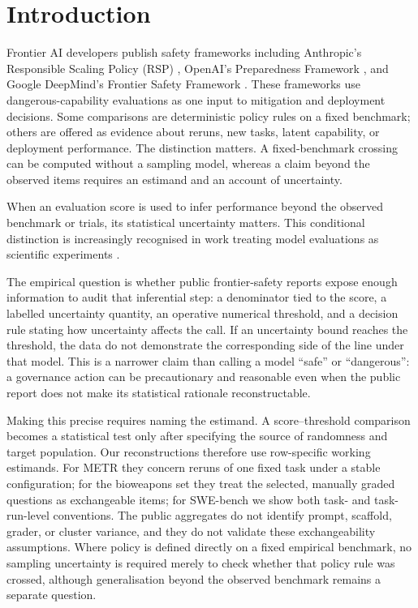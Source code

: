 \documentclass{article}
\begin{document}
\section{Introduction}

Frontier AI developers publish safety frameworks including Anthropic's Responsible Scaling
Policy (RSP) \citep{anthropic2026rsp}, OpenAI's Preparedness Framework
\citep{openai2025preparedness}, and Google DeepMind's Frontier Safety Framework
\citep{deepmind2025fsf}. These frameworks use dangerous-capability evaluations as one input
to mitigation and deployment decisions. Some comparisons are deterministic policy rules on
a fixed benchmark; others are offered as evidence about reruns, new tasks, latent
capability, or deployment performance. The distinction matters. A fixed-benchmark crossing
can be computed without a sampling model, whereas a claim beyond the observed items requires
an estimand and an account of uncertainty.

When an evaluation score is used to infer performance beyond the observed benchmark or
trials, its statistical uncertainty matters. This conditional distinction is increasingly
recognised in work treating model evaluations as scientific experiments
\citep{miller2024adding,madaan2024quantifying,heineman2025signal,bowyer2025position,raman2025intolerable}.


The empirical question is whether public frontier-safety reports expose enough information
to audit that inferential step: a denominator tied to the score, a labelled uncertainty
quantity, an operative numerical threshold, and a decision rule stating how uncertainty
affects the call. If an uncertainty bound reaches the threshold, the data do not demonstrate
the corresponding side of the line under that model. This is a narrower claim than calling
a model ``safe'' or ``dangerous'': a governance action can be precautionary and reasonable
even when the public report does not make its statistical rationale reconstructable.

Making this precise requires naming the estimand. A score--threshold comparison becomes a
statistical test only after specifying the source of randomness and target population. Our
reconstructions therefore use row-specific working estimands. For METR they concern reruns
of one fixed task under a stable configuration; for the bioweapons set they treat the
selected, manually graded questions as exchangeable items; for SWE-bench we show both
task- and task-run-level conventions. The public aggregates do not identify prompt,
scaffold, grader, or cluster variance, and they do not validate these exchangeability
assumptions. Where policy is defined directly on a fixed empirical benchmark, no sampling
uncertainty is required merely to check whether that policy rule was crossed, although
generalisation beyond the observed benchmark remains a separate question.
\end{document}
